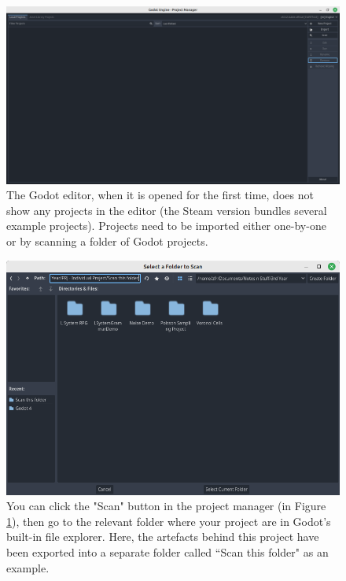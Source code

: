 \begin{figure}[H]
    \centering
    \includegraphics[width=\textwidth]{Images/open_godot.png}
    \caption{The Godot editor, when it is opened for the first time, does not show any projects in the editor (the Steam version bundles several example projects). Projects need to be imported either one-by-one or by scanning a folder of Godot projects.}
    \label{fig:godot1}
\end{figure}

\begin{figure}[H]
    \centering
    \includegraphics[width=\textwidth]{Images/scan-folder.png}
    \caption{You can click the "Scan" button in the project manager (in Figure \ref{fig:godot1}), then go to the relevant folder where your project are in Godot's built-in file explorer. Here, the artefacts behind this project have been exported into a separate folder called ``Scan this folder" as an example.}
    \label{fig:godot2}
\end{figure}

